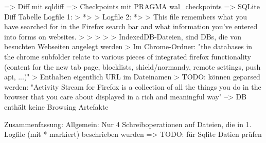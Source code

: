 	=> Diff mit sqldiff
	=> Checkpoints mit PRAGMA wal\_checkpoints
	=> SQLite Diff Tabelle 
	Logfile 1:
		> %
		*> %
		> %
	Logfile 2:
		*> %
		> %
			This file remembers what you have searched for in the Firefox search bar and what information you’ve entered into forms on websites.
		> %
		> %
		> %
		> %
			> IndexedDB-Dateien, sind DBs, die von besuchten Webseiten
			angelegt werden %
			> Im Chrome-Ordner: "the databases in the chrome subfolder relate to various pieces of integrated firefox functionality (content for the new tab page, blocklists, shield/normandy, remote settings, push api, ...)"
			> Enthalten eigentlich URL im Dateinamen
			> TODO: können geparsed werden: %
			"Activity Stream for Firefox is a collection of all the things you do in the browser that you care about displayed in a rich and meaningful way" 
			--> DB enthält keine Browsing Artefakte

Zusammenfassung:
	Allgemein: Nur 4 Schreiboperationen auf Dateien, die in 1. Logfile (mit * markiert) beschrieben wurden => TODO: für Sqlite Datien prüfen

